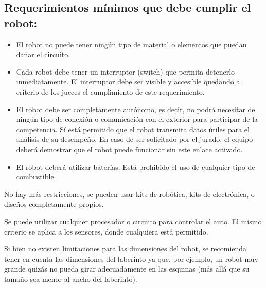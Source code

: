 \documentclass[a4paper,11pt]{article}
\begin{document}
\subsection*{Requerimientos mínimos que debe cumplir el robot:}
\begin{itemize}
  \item El robot no puede tener ningún tipo de material o elementos que puedan dañar el circuito.
  \item Cada robot debe tener un interruptor (switch) que permita detenerlo inmediatamente. El interruptor debe ser visible y accesible quedando a criterio de los jueces el cumplimiento de este requerimiento.
  \item El robot debe ser completamente autónomo, es decir, no podrá necesitar de ningún tipo de conexión o comunicación con el exterior para participar de la competencia. Sí está permitido que el robot transmita datos útiles para el análisis de su desempeño. En caso de ser solicitado por el jurado, el equipo deberá demostrar que el robot puede funcionar sin este enlace activado.
  \item El robot deberá utilizar baterías. Está prohibido el uso de cualquier tipo de combustible.
\end{itemize}

No hay más restricciones, se pueden usar kits de robótica, kits de electrónica, o diseños completamente propios.

Se puede utilizar cualquier procesador o circuito para controlar el auto. El mismo criterio se aplica a los sensores, donde cualquiera está permitido.

Si bien no existen limitaciones para las dimensiones del robot, se recomienda tener en cuenta las dimensiones del laberinto ya que, por ejemplo, un robot muy grande quizás no pueda girar adecuadamente en las esquinas (más allá que su tamaño sea menor al ancho del laberinto).
\end{document}
